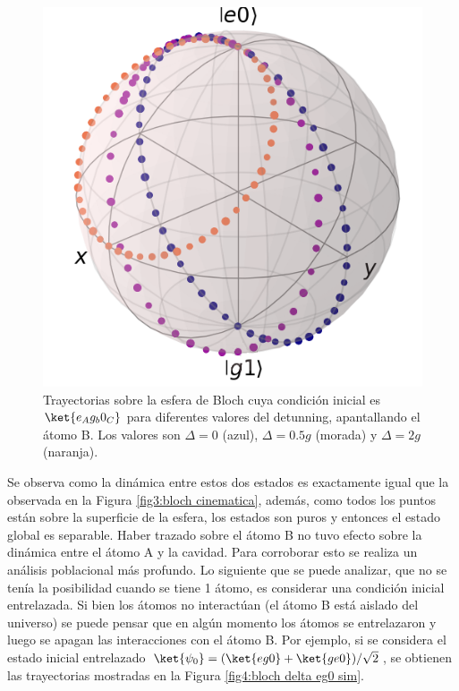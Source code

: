 \begin{figure}[H]
    \begin{minipage}[c]{0.67\textwidth}
        \includegraphics[width=\textwidth]{figuras/ch4/bloch eg0 bloch AC a=0 d=2.0 x=0.0 k=0.0 J=0.0 gamma=0.0 p=0.0.png}
    \end{minipage}\hfill
    \begin{minipage}[c]{0.3\textwidth}
        \caption{Trayectorias sobre la esfera de Bloch cuya condición inicial es $\ket{e_Ag_b0_C}$ para diferentes valores del detunning, apantallando el átomo B. Los valores son $\Delta=0$ (azul), $\Delta=0.5g$ (morada) y $\Delta=2g$ (naranja).}
        \label{fig4:bloch delta eg0}
    \end{minipage}
\end{figure}
Se observa como la dinámica entre estos dos estados es exactamente igual que la observada en la Figura \ref{fig3:bloch cinematica}, además, como todos los puntos están sobre la superficie de la esfera, los estados son puros y entonces el estado global es separable. Haber trazado sobre el átomo B no tuvo efecto sobre la dinámica entre el átomo A y la cavidad. Para corroborar esto se realiza un análisis poblacional más profundo.
Lo siguiente que se puede analizar, que no se tenía la posibilidad cuando se tiene 1 átomo, es considerar una condición inicial entrelazada. Si bien los átomos no interactúan (el átomo B está aislado del universo) se puede pensar que en algún momento los átomos se entrelazaron y luego se apagan las interacciones con el átomo B. Por ejemplo, si se considera el estado inicial entrelazado $\ket{\psi_0}=(\ket{eg0}+\ket{ge0})/\sqrt{2}$, se obtienen las trayectorias mostradas en la Figura \ref{fig4:bloch delta eg0 sim}.
